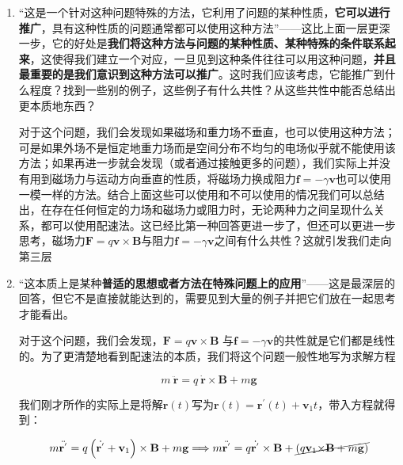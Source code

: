 \documentclass{ctexart}
\begin{document}
\begin{myexample}
\begin{enumerate}[leftmargin=*, labelsep=0.5em]
    \item “这是一个针对这种问题特殊的方法，它利用了问题的某种性质，\textbf{它可以进行推广}，具有这种性质的问题通常都可以使用这种方法”——这比上面一层更深一步，它的好处是\textbf{我们将这种方法与问题的某种性质、某种特殊的条件联系起来}，这使得我们建立一个对应，一旦见到这种条件往往可以用这种问题，\textbf{并且最重要的是我们意识到这种方法可以推广}。这时我们应该考虑，它能推广到什么程度？找到一些别的例子，这些例子有什么共性？从这些共性中能否总结出更本质地东西？
    
    对于这个问题，我们会发现如果磁场和重力场不垂直，也可以使用这种方法；可是如果外场不是恒定地重力场而是空间分布不均匀的电场似乎就不能使用该方法；如果再进一步就会发现（或者通过接触更多的问题），我们实际上并没有用到磁场力与运动方向垂直的性质，将磁场力换成阻力$\mathbf{f} = - \gamma\mathbf{v}$也可以使用一模一样的方法。结合上面这些可以使用和不可以使用的情况我们可以总结出，在存在任何恒定的力场和磁场力或阻力时，无论两种力之间呈现什么关系，都可以使用配速法。这已经比第一种回答更进一步了，但还可以更进一步思考，磁场力$\mathbf{F} = q\mathbf{v} \times \mathbf{B}$与阻力$\mathbf{f} = - \gamma\mathbf{v}$之间有什么共性？这就引发我们走向第三层
    
    
    \item “这本质上是某种\textbf{普适的思想或者方法在特殊问题上的应用}”——这是最深层的回答，但它不是直接就能达到的，需要见到大量的例子并把它们放在一起思考才能看出。
    
    对于这个问题，我们会发现，$\mathbf{F} = q\mathbf{v} \times \mathbf{B}$
    与$\mathbf{f} = - \gamma\mathbf{v}$的共性就是它们都是线性的。为了更清楚地看到配速法的本质，我们将这个问题一般性地写为求解方程
    
    \begin{equation*}
    m\ \ddot{\mathbf{r}} = q\ \dot{\mathbf{r}} \times \mathbf{B} + m\mathbf{g}
    \end{equation*}
    
    我们刚才所作的实际上是将解$\mathbf{r}(t)$写为$\mathbf{r}(t) = \mathbf{r}^{\mathbf{'}}(t) + \mathbf{v}_{1}t$，带入方程就得到：
    
    \begin{equation*}
    m\ddot{\mathbf{r}^{\mathbf{'}}} = q\left( \dot{\mathbf{r}^{\mathbf{'}}} + \mathbf{v}_{1} \right) \times \mathbf{B} + m\mathbf{g} \Longrightarrow m\ddot{\mathbf{r}^{\mathbf{'}}} = q\dot{\mathbf{r}^{\mathbf{'}}} \times \mathbf{B} + \cancel{\left( q\mathbf{v}_{1}\mathbf{\times B} + m\mathbf{g} \right)}
    \end{equation*}
    

\end{enumerate}
\end{myexample}
\end{document}
